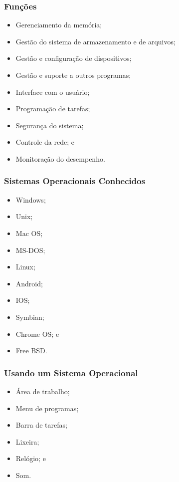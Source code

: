 \documentclass[aspectratio=169]{beamer} %
\begin{document}
\begin{frame}
	\frametitle{Funções}
		
	\begin{itemize}
		\item Gerenciamento da memória;
		\item Gestão do sistema de armazenamento e de arquivos; 
		\item Gestão e configuração de dispositivos;
		\item Gestão e suporte a outros programas; 
		\item Interface com o usuário;
		\item Programação de tarefas;
		\item Segurança do sistema;
		\item Controle da rede; e
		\item Monitoração do desempenho.
	\end{itemize}
\end{frame}

\begin{frame}
	\frametitle{Sistemas Operacionais Conhecidos}
		
	\begin{itemize}
		\item Windows;
		\item Unix;
		\item Mac OS;
		\item MS-DOS;
		\item Linux;
		\item Android;
		\item IOS;
		\item Symbian;
		\item Chrome OS; e
		\item Free BSD.
	\end{itemize}
\end{frame}

\begin{frame}
	\frametitle{Usando um Sistema Operacional}
		
	\begin{itemize}
		\item Área de trabalho;
		\item Menu de programas;
		\item Barra de tarefas;
		\item Lixeira;
		\item Relógio; e
		\item Som.
	\end{itemize}
\end{frame}
\end{document}
